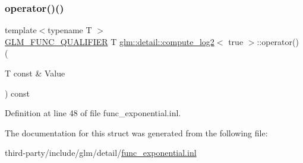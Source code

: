 \subsubsection{\texorpdfstring{operator()()}{operator()()}}
{\footnotesize\ttfamily template$<$typename T $>$ \\
\hyperlink{setup_8hpp_a33fdea6f91c5f834105f7415e2a64407}{G\+L\+M\+\_\+\+F\+U\+N\+C\+\_\+\+Q\+U\+A\+L\+I\+F\+I\+ER} T \hyperlink{structglm_1_1detail_1_1compute__log2}{glm\+::detail\+::compute\+\_\+log2}$<$ true $>$\+::operator() (\begin{DoxyParamCaption}\item[{T const \&}]{Value }\end{DoxyParamCaption}) const\hspace{0.3cm}{\ttfamily [inline]}}



Definition at line 48 of file func\+\_\+exponential.\+inl.



The documentation for this struct was generated from the following file\+:\begin{DoxyCompactItemize}
\item 
third-\/party/include/glm/detail/\hyperlink{func__exponential_8inl}{func\+\_\+exponential.\+inl}\end{DoxyCompactItemize}
